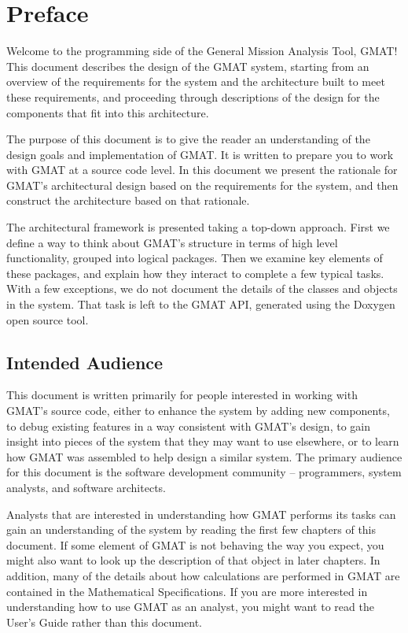 \chapter{Preface}

Welcome to the programming side of the General Mission Analysis Tool, GMAT!  This document
describes the design of the GMAT system, starting from an overview of the requirements for the
system and the architecture built to meet these requirements, and proceeding through descriptions
of the design for the components that fit into this architecture.

The purpose of this document is to give the reader an understanding of the design goals and
implementation of GMAT.  It is written to prepare you to work with GMAT at a source code level.  In
this document we present the rationale for GMAT's architectural design based on the requirements for
the system, and then construct the architecture based on that rationale.

The architectural framework is presented taking a top-down approach.  First we define a way to think
about GMAT's structure in terms of high level functionality, grouped into logical packages.  Then we
examine key elements of these packages, and explain how they interact to complete a few typical
tasks.  With a few exceptions, we do not document the details of the classes and objects in the
system.  That task is left to the GMAT API, generated using the Doxygen\cite{doxygen} open source
tool.

\section*{Intended Audience}

This document is written primarily for people interested in working with GMAT's source code, either
to enhance the system by adding new components, to debug existing features in a way consistent
with GMAT's design, to gain insight into pieces of the system that they may want to use elsewhere,
or to learn how GMAT was assembled to help design a similar system.  The primary audience for this
document is the software development community -- programmers, system analysts, and software
architects.

Analysts that are interested in understanding how GMAT performs its tasks can gain an understanding
of the system by reading the first few chapters of this document.  If some element of GMAT is not
behaving the way you expect, you might also want to look up the description of that object in later
chapters.  In addition, many of the details about how calculations are performed in GMAT are
contained in the Mathematical Specifications\cite{mathSpec}.  If you are more interested in
understanding how to use GMAT as an analyst, you might want to read the User's Guide\cite{userGuide}
rather than this document.

